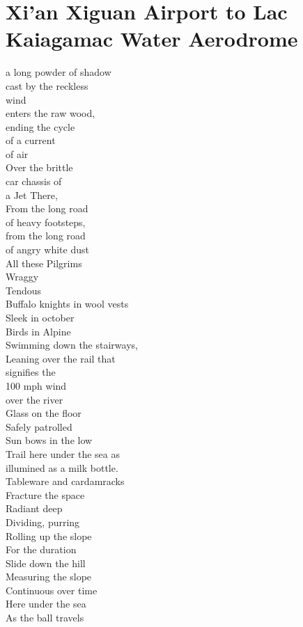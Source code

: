 \documentclass[smalldemyvopaper,11pt,twoside,onecolumn,openright,extrafontsizes]{memoir}
\begin{document}
\chapter{Xi'an Xiguan Airport to Lac Kaiagamac Water Aerodrome}
a long powder of shadow
\\cast by the reckless
\\wind
\\enters the raw wood,
\\ending the cycle
\\of a current
\\of air
\\Over the brittle
\\car chassis of
\\a Jet There,
\\From the long road
\\of heavy footsteps,
\\from the long road
\\of angry white dust
\\All these Pilgrims
\\Wraggy
\\Tendous
\\Buffalo knights in wool vests
\\Sleek in october
\\Birds in Alpine
\\Swimming down the stairways,
\\Leaning over the rail that
\\signifies the
\\100 mph wind
\\over the river
\\Glass on the floor
\\Safely patrolled
\\Sun bows in the low
\\Trail here under the sea as
\\illumined as a milk bottle.
\\Tableware and cardamracks
\\Fracture the space
\\Radiant deep
\\Dividing, purring
\\Rolling up the slope
\\For the duration
\\Slide down the hill
\\Measuring the slope
\\Continuous over time
\\Here under the sea
\\As the ball travels
\end{document}
